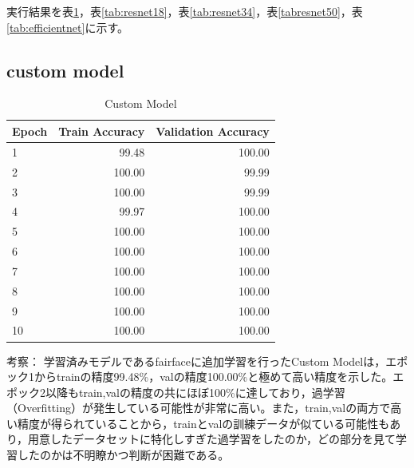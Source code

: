 \documentclass[a4paper,11pt,titlepage]{jsarticle}
\begin{document}
実行結果を表\ref{tab:custom}，表\ref{tab:resnet18}，表\ref{tab:resnet34}，表\ref{tabresnet50}，表\ref{tab:efficientnet}に示す。

\subsection{custom model}
\begin{table}[H]
\centering
\caption{Custom Model}
\label{tab:custom}
\begin{tabular}{lrr}
\hline
 Epoch &  Train Accuracy &  Validation Accuracy \\
\hline
     1 &           99.48 &               100.00 \\
     2 &          100.00 &                99.99 \\
     3 &          100.00 &                99.99 \\
     4 &           99.97 &               100.00 \\
     5 &          100.00 &               100.00 \\
     6 &          100.00 &               100.00 \\
     7 &          100.00 &               100.00 \\
     8 &          100.00 &               100.00 \\
     9 &          100.00 &               100.00 \\
    10 &          100.00 &               100.00 \\
\hline
\end{tabular}
\end{table}

考察：
学習済みモデルであるfairfaceに追加学習を行ったCustom Modelは，エポック1からtrainの精度99.48\%，valの精度100.00\%と極めて高い精度を示した。エポック2以降もtrain,valの精度の共にほぼ100\%に達しており，過学習（Overfitting）が発生している可能性が非常に高い。また，train,valの両方で高い精度が得られていることから，trainとvalの訓練データが似ている可能性もあり，用意したデータセットに特化しすぎた過学習をしたのか，どの部分を見て学習したのかは不明瞭かつ判断が困難である。
\end{document}
